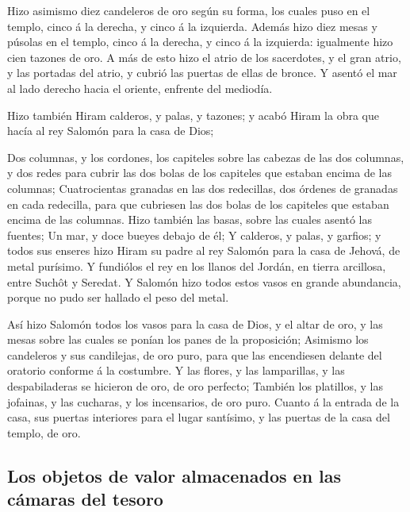 Hizo asimismo diez candeleros de oro según su forma, los
cuales puso en el templo, cinco á la derecha, y cinco á la izquierda.
 Además hizo diez mesas y púsolas en el templo, cinco á la
derecha, y cinco á la izquierda: igualmente hizo cien tazones de oro.
 A más de esto hizo el atrio de los sacerdotes, y el gran
atrio, y las portadas del atrio, y cubrió las puertas de ellas de
bronce.  Y asentó el mar al lado derecho hacia el
oriente, enfrente del mediodía.

 Hizo también Hiram calderos, y palas, y tazones; y acabó
Hiram la obra que hacía al rey Salomón para la casa de Dios;

 Dos columnas, y los cordones, los capiteles sobre las
cabezas de las dos columnas, y dos redes para cubrir las dos bolas de
los capiteles que estaban encima de las columnas; 
Cuatrocientas granadas en las dos redecillas, dos órdenes de granadas en
cada redecilla, para que cubriesen las dos bolas de los capiteles que
estaban encima de las columnas.  Hizo también las basas,
sobre las cuales asentó las fuentes;  Un mar, y doce
bueyes debajo de él;  Y calderos, y palas, y garfios; y
todos sus enseres hizo Hiram su padre al rey Salomón para la casa de
Jehová, de metal purísimo.  Y fundiólos el rey en los
llanos del Jordán, en tierra arcillosa, entre Suchôt y Seredat.
 Y Salomón hizo todos estos vasos en grande abundancia,
porque no pudo ser hallado el peso del metal.

 Así hizo Salomón todos los vasos para la casa de Dios, y
el altar de oro, y las mesas sobre las cuales se ponían los panes de la
proposición;  Asimismo los candeleros y sus candilejas,
de oro puro, para que las encendiesen delante del oratorio conforme á la
costumbre.  Y las flores, y las lamparillas, y las
despabiladeras se hicieron de oro, de oro perfecto; 
También los platillos, y las jofainas, y las cucharas, y los
incensarios, de oro puro. Cuanto á la entrada de la casa, sus puertas
interiores para el lugar santísimo, y las puertas de la casa del templo,
de oro.

\hypertarget{los-objetos-de-valor-almacenados-en-las-cuxe1maras-del-tesoro}{%
\subsection{Los objetos de valor almacenados en las cámaras del
tesoro}\label{los-objetos-de-valor-almacenados-en-las-cuxe1maras-del-tesoro}}


